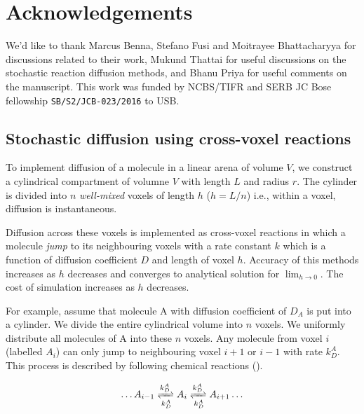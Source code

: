 \documentclass[9pt,lineno,doublespacing]{elife}
\begin{document}
\section{Acknowledgements}
We'd like to thank Marcus Benna, Stefano Fusi and Moitrayee Bhattacharyya for
discussions related to their work, Mukund Thattai for useful discussions on the
stochastic reaction diffusion methods, and Bhanu Priya for useful comments on
the manuscript. This work was funded by NCBS/TIFR and SERB JC Bose fellowship
\texttt{SB/S2/JCB-023/2016} to USB.

 

\appendix
\begin{appendixbox}

\subsection*{Stochastic diffusion using cross-voxel reactions}\label{sec:diff_as_gillespie}

To implement diffusion of a molecule in a linear arena of volume $V$, we
construct a cylindrical compartment of volumne $V$ with length $L$ and radius
$r$. The cylinder is divided into $n$ \emph{well-mixed} voxels of length $h$
($h=L/n$) i.e., within a voxel, diffusion is instantaneous.

Diffusion across these voxels is implemented as cross-voxel reactions in which a
molecule \emph{jump} to its neighbouring voxels with a rate constant $k$ which
is a function of diffusion coefficient $D$ and length of voxel $h$. Accuracy of
this methods increases as $h$ decreases and converges to analytical solution for
$\lim_{h \to 0}$. The cost of simulation increases as $h$ decreases.

For example, assume that molecule A with diffusion coefficient of $D_A$ is put
into a cylinder. We divide the entire cylindrical volume into $n$ voxels. We
uniformly distribute all molecules of A into these $n$ voxels. Any molecule from
voxel $i$ (labelled $A_i$) can only jump to neighbouring voxel $i+1$ or $i-1$
with rate $k_D^A$. This process is described by following chemical reactions
().

\begin{equation}
\begin{gathered}
    \ldots A_{i-1} \xrightleftharpoons[k_D^A]{k_D^A} A_{i}
    \xrightleftharpoons[k_D^A]{k_D^A} A_{i+1} \ldots
\end{gathered}
\label{eq:stoch_diff}
\end{equation}



\end{appendixbox}
\end{document}
